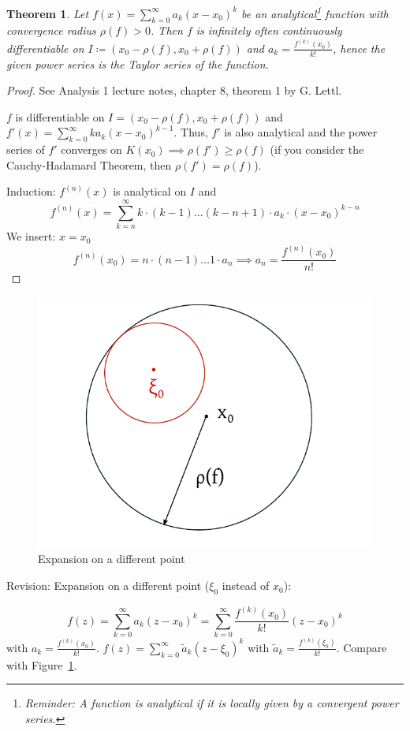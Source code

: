 \documentclass{article}
\newtheorem{theorem}{Theorem}  \numberwithin{theorem}{section}
\begin{document}
\begin{theorem} %
  Let $f(x) = \sum_{k=0}^\infty a_k (x - x_0)^k$ be an analytical\footnote{Reminder: A function is analytical if it is locally given by a convergent power series.} function with convergence radius $\rho(f) > 0$.
  Then $f$ is infinitely often continuously differentiable on $I \coloneqq (x_0 - \rho(f), x_0 + \rho(f))$
  and $a_k = \frac{f^{(k)}(x_0)}{k!}$, hence the given power series is the Taylor series of the function.
\end{theorem}

\begin{proof}
  See Analysis 1 lecture notes, chapter 8, theorem 1 by G. Lettl.

  $f$ is differentiable on $I = (x_0 - \rho(f), x_0 + \rho(f))$ and $f'(x) = \sum_{k=0}^\infty k a_k (x - x_0)^{k-1}$.
  Thus, $f'$ is also analytical and the power series of $f'$ converges on $K(x_0) \implies \rho(f') \geq \rho(f)$
  (if you consider the Cauchy-Hadamard Theorem, then $\rho(f') = \rho(f)$).

  Induction:
  $f^{(n)}(x)$ is analytical on $I$ and
  \[ f^{(n)}(x) = \sum_{k=n}^\infty k \cdot (k - 1) \dots (k - n + 1) \cdot a_k \cdot (x - x_0)^{k-n} \]
  We insert: $x = x_0$
  \[ f^{(n)}(x_0) = n \cdot (n - 1) \dots 1 \cdot a_n \implies a_n = \frac{f^{(n)}(x_0)}{n!} \]
\end{proof}

\begin{figure}[t]
  \begin{center}
    \includegraphics[width=.4\textwidth]{img/29_expansion_on_a_different_point.pdf}
    \caption{Expansion on a different point}
    \label{img:expan}
  \end{center}
\end{figure}

Revision: Expansion on a different point ($\xi_0$ instead of $x_0$):

\[ f(z) = \sum_{k=0}^\infty a_k (z - x_0)^k = \sum_{k=0}^\infty \frac{f^{(k)}(x_0)}{k!} (z - x_0)^k \]
with $a_k = \frac{f^{(k)}(x_0)}{k!}$. $f(z) = \sum_{k=0}^\infty \tilde a_k(z - \xi_0)^k$ with $\tilde a_k = \frac{f^{(k)}(\xi_0)}{k!}$.
Compare with Figure~\ref{img:expan}.
\end{document}
